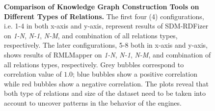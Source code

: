 \begin{figure}[!tb]
    \caption[Knowledge Graph Construction Tools on Different Types of Relations]{\textbf{Comparison of Knowledge Graph Construction Tools on Different Types of Relations.} The first four (4) configurations, i.e. 1-4 in both x-axis and y-axis, represent results of SDM-RDFizer on \textit{1-N}, \textit{N-1}, \textit{N-M}, and combination of all relations types, respectively. The later configurations, 5-8 both in x-axis and y-axis, shows results of RMLMapper on \textit{1-N}, \textit{N-1}, \textit{N-M}, and combination of all relations types, respectively. Grey bubbles correspond to correlation value of $1.0$; blue bubbles show a positive correlation while red bubbles show a negative correlation. The plots reveal that both type of relations and size of the dataset need to be taken into account to uncover patterns in the behavior of the engines. 
    }
    \label{fig:relation_type_bubble}
\end{figure}


